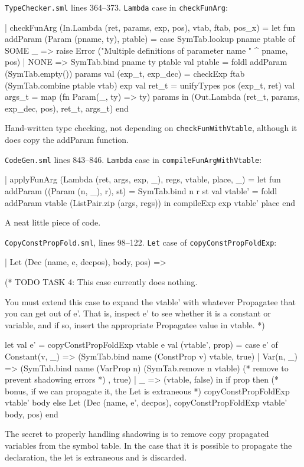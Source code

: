 \documentclass[12pt, a4paper]{article}
\begin{document}
\texttt{TypeChecker.sml} lines 364--373. \texttt{Lambda} case in \texttt{checkFunArg}:
\begin{lstlistings}
  | checkFunArg (In.Lambda (ret, params, exp, pos), vtab, ftab, pos_x) =
      let fun addParam (Param (pname, ty), ptable) =
              case SymTab.lookup pname ptable of
                    SOME _ => raise Error ("Multiple definitions of parameter name " ^ pname, pos)
                  | NONE   => SymTab.bind pname ty ptable
          val ptable = foldl addParam (SymTab.empty()) params
          val (exp_t, exp_dec) = checkExp ftab (SymTab.combine ptable vtab) exp
          val ret_t = unifyTypes pos (exp_t, ret)
          val args_t = map (fn Param(_, ty) => ty) params
      in (Out.Lambda (ret_t, params, exp_dec, pos), ret_t, args_t) end
\end{lstlistings}
Hand-written type checking, not depending on \texttt{checkFunWithVtable}, although it does
copy the addParam function.

\texttt{CodeGen.sml} lines 843--846. \texttt{Lambda} case in \texttt{compileFunArgWithVtable}:
\begin{lstlistings}
    | applyFunArg (Lambda (ret, args, exp, _), regs, vtable, place, _) =
      let fun addParam ((Param (n, _), r), st) = SymTab.bind n r st
          val vtable' = foldl addParam vtable (ListPair.zip (args, regs))
      in compileExp exp vtable' place end
\end{lstlistings}
A neat little piece of code.

\texttt{CopyConstPropFold.sml}, lines 98--122. \texttt{Let} case of
\texttt{copyConstPropFoldExp}:
\begin{lstlistings}
      | Let (Dec (name, e, decpos), body, pos) =>

        (* TODO TASK 4: This case currently does nothing.

         You must extend this case to expand the vtable' with whatever
         Propagatee that you can get out of e'.  That is, inspect e'
         to see whether it is a constant or variable, and if so,
         insert the appropriate Propagatee value in vtable. *)

        let val e' = copyConstPropFoldExp vtable e
            val (vtable', prop) =
                case e' of 
                     Constant(v, _) => (SymTab.bind name (ConstProp v) vtable, true)
                   | Var(n, _) =>
                       (SymTab.bind name (VarProp n)
                          (SymTab.remove n vtable) (* remove to prevent shadowing errors *)
                       , true)
                   | _ => (vtable, false)
        in if prop then
                (* bonus, if we can propagate it, the Let is extraneous *)
                copyConstPropFoldExp vtable' body
           else Let (Dec (name, e', decpos),
                copyConstPropFoldExp vtable' body,
                pos)
        end
\end{lstlistings}
The secret to properly handling shadowing is to remove copy propagated variables from the
symbol table. In the case that it is possible to propagate the declaration, the let is extraneous
and is discarded.
\end{document}
